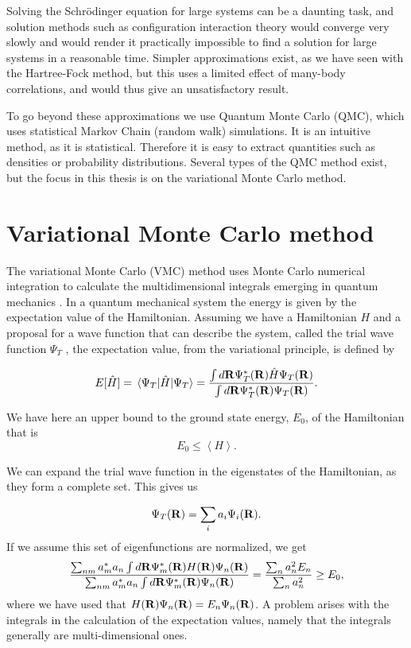 Solving the Schr\"{o}dinger equation for large systems can be a
daunting task, and solution methods such as configuration interaction
theory would converge very slowly and would render it practically impossible
to find a solution for large systems in a reasonable time. Simpler
approximations exist, as we have seen with the Hartree-Fock method,
but this uses a limited effect of many-body correlations, and would
thus give an unsatisfactory result.

To go beyond these approximations we use Quantum Monte Carlo (QMC),
which uses statistical Markov Chain (random walk) simulations. It is
an intuitive method, as it is statistical. Therefore it is easy to
extract quantities such as densities or probability
distributions. Several types of the QMC method exist, but the focus in
this thesis is on the variational Monte Carlo method.


\section{Variational Monte Carlo method}
		The variational Monte Carlo (VMC) method uses Monte Carlo numerical integration to calculate the multidimensional integrals emerging in quantum mechanics \cite{mcmillan1965} \cite{ceperley1977}. In a quantum mechanical system the energy is given by the expectation value of the Hamiltonian. Assuming we have a Hamiltonian $H$ and a proposal for a wave function that can describe the system, called the trial wave function  \(\Psi_T\) , the expectation value, from the variational principle, is defined by

		\begin{align}\label{eq:expval1}
			E[\hat{H}] = \expval{\hat{H}}{\Psi_T} = \frac{\int{d\vb{R} \Psi_T^*(\vb{R})\hat{H} \Psi_T(\vb{R})  }}{ \int{d\vb{R} \Psi_T^*(\vb{R}) \Psi_T(\vb{R}) }}.
		\end{align}

		We have here an upper bound to the ground state energy, $E_0$, of the Hamiltonian that is
		\[
			E_0 \leq \left\langle H \right\rangle.
		\]
		
		We can expand the trial wave function in the eigenstates of the Hamiltonian, as they form a complete set. This gives us 

		\[
			\Psi_T(\vb{R}) = \sum_i a_i \Psi_i (\vb{R}).
		\]
		If we assume this set of eigenfunctions are normalized, we get
		\[
     	\frac{\sum_{nm}a^*_ma_n \int d\vb{R}\Psi^{\ast}_m(\vb{R})H(\vb{R})\Psi_n(\vb{R})}
        {\sum_{nm}a^*_ma_n \int d\vb{R}\Psi^{\ast}_m(\vb{R})\Psi_n(\vb{R})} =\frac{\sum_{n}a^2_n E_n}
        {\sum_{n}a^2_n} \ge E_0,
		\]
		where we have used that $H(\vb{R})\Psi_n(\vb{R})=E_n\Psi_n(\vb{R})$. A problem arises with the integrals in the calculation of the expectation values, namely that the integrals generally are multi-dimensional ones. 

